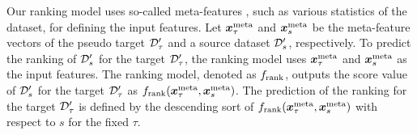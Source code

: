 Our ranking model uses so-called meta-features \cite{NIPS2015_11d0e628,feurer2015initializing}, such as various statistics of the dataset, for defining the input features.
%
Let 
$\boldsymbol{x}_\tau^{\rm meta}$
and
$\boldsymbol{x}_s^{\rm meta}$
be the meta-feature vectors of the pseudo target  
${\mathcal D}_\tau^\prime$
and 
a source dataset 
${\mathcal D}_s^\prime$, 
respectively.
%
%
%
To predict the ranking of ${\mathcal D}_s^\prime$ for the target 
${\mathcal D}_\tau^\prime$, 
the ranking model uses 
$\boldsymbol{x}_\tau^{\rm meta}$
and
$\boldsymbol{x}_s^{\rm meta}$
as the input features.
%
The ranking model, denoted as $f_{\rm rank}$, outputs the score value of ${\mathcal D}_s^\prime$ for the target ${\mathcal D}_\tau^\prime$ as 
$f_{\rm rank}(\boldsymbol{x}_\tau^{\rm meta}, \boldsymbol{x}_s^{\rm meta})$.
%
The prediction of the ranking for the target ${\mathcal D}_\tau^\prime$ is defined by the descending sort of 
$f_{\rm rank}(\boldsymbol{x}_\tau^{\rm meta}, \boldsymbol{x}_s^{\rm meta})$ 
with respect to $s$ for the fixed $\tau$.


